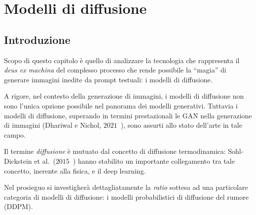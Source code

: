 \chapter{Modelli di diffusione}\label{chap:diff_models}

\section{Introduzione}

Scopo di questo capitolo è quello di analizzare la tecnologia che rappresenta il \emph{deus ex machina} del complesso processo 
che rende possibile la “magia” di generare immagini inedite da prompt testuali: i modelli di diffusione.

A rigore, nel contesto della generazione di immagini, i modelli di diffusione non sono l'unica opzione possibile nel panorama dei modelli generativi.
Tuttavia i modelli di diffusione, superando in termini prestazionali le GAN nella generazione di immagini (Dhariwal e Nichol, $2021$~\cite{dhariwal2021}),
sono assurti allo stato dell'arte in tale campo.

Il termine \emph{diffusione} è mutuato dal concetto di diffusione termodinamica: Sohl-Dickstein et al.\ ($2015$~\cite{sohl-dickstein2015}) 
hanno stabilito un importante collegamento tra tale concetto, inerente alla fisica, e il deep learning. 


Nel prosieguo si investigherà dettagliatamente la \emph{ratio} sottesa ad una particolare categoria di modelli di diffusione: 
i modelli probabilistici di diffusione del rumore (DDPM).





